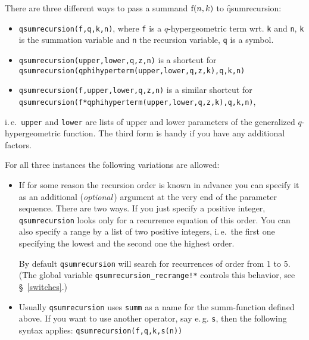There are three different ways to pass a summand ${\mathrm f}(n,k)$
to \f{qsumrecursion}:
%
\begin{itemize}
	\item \texttt{qsumrecursion(f,q,k,n)}, where \texttt{f} is a
		$q$-hypergeometric term wrt. \texttt{k} and \texttt{n},
		\texttt{k} is the summation variable and \texttt{n} the recursion
		variable, \texttt{q} is a symbol.
	\item \texttt{qsumrecursion(upper,lower,q,z,n)} is a shortcut for \\
		\texttt{qsumrecursion(qphihyperterm(upper,lower,q,z,k),q,k,n)}
	\item \texttt{qsumrecursion(f,upper,lower,q,z,n)} is a similar
		shortcut for\\
		\texttt{qsumrecursion(f*qphihyperterm(upper,lower,q,z,k),q,k,n)},
\end{itemize}
%
i.\,e.\ \texttt{upper} and \texttt{lower} are lists of upper and lower
parameters of the generalized $q$-hypergeometric function.
The third form is handy if you have any additional factors.

For all three instances the following variations are allowed:
\begin{itemize}
	\item If for some reason the recursion order is known in
		advance you can specify it as an additional ({\sl optional}\,)
		argument at the very end of the parameter sequence. There are two
		ways. If you just specify a positive integer,
		\texttt{qsumrecursion} looks only for a recurrence equation of this order.
		You can also specify a range by a list of two positive integers,
		i.\,e.\ the first one specifying the lowest and the second one the
		highest order.

		By default \texttt{qsumrecursion} will search for recurrences
		of order from 1 to 5. (The global variable
		\texttt{qsumrecursion\_recrange!*} controls this behavior,
		see \S~\ref{switches}.)
	\item Usually \texttt{qsumrecursion} uses \texttt{summ} as a name
		for the $\mathrm{summ}$-function defined above. If you want
		to use another operator, say e.\,g. \texttt{s}, then the
		following syntax applies: \texttt{qsumrecursion(f,q,k,s(n))}
\end{itemize}

